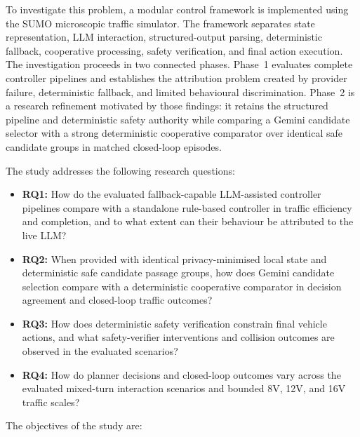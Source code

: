 \documentclass[letterpaper,10pt,conference]{ieeeconf}
\begin{document}
To investigate this problem, a modular control framework is implemented using the SUMO microscopic traffic simulator. The framework separates state representation, LLM interaction, structured-output parsing, deterministic fallback, cooperative processing, safety verification, and final action execution. The investigation proceeds in two connected phases. Phase~1 evaluates complete controller pipelines and establishes the attribution problem created by provider failure, deterministic fallback, and limited behavioural discrimination. Phase~2 is a research refinement motivated by those findings: it retains the structured pipeline and deterministic safety authority while comparing a Gemini candidate selector with a strong deterministic cooperative comparator over identical safe candidate groups in matched closed-loop episodes.



The study addresses the following research questions:



\begin{itemize}

    \item \textbf{RQ1:} How do the evaluated fallback-capable LLM-assisted controller pipelines compare with a standalone rule-based controller in traffic efficiency and completion, and to what extent can their behaviour be attributed to the live LLM?

    \item \textbf{RQ2:} When provided with identical privacy-minimised local state and deterministic safe candidate passage groups, how does Gemini candidate selection compare with a deterministic cooperative comparator in decision agreement and closed-loop traffic outcomes?

    \item \textbf{RQ3:} How does deterministic safety verification constrain final vehicle actions, and what safety-verifier interventions and collision outcomes are observed in the evaluated scenarios?

    \item \textbf{RQ4:} How do planner decisions and closed-loop outcomes vary across the evaluated mixed-turn interaction scenarios and bounded 8V, 12V, and 16V traffic scales?

\end{itemize}



The objectives of the study are:
\end{document}
